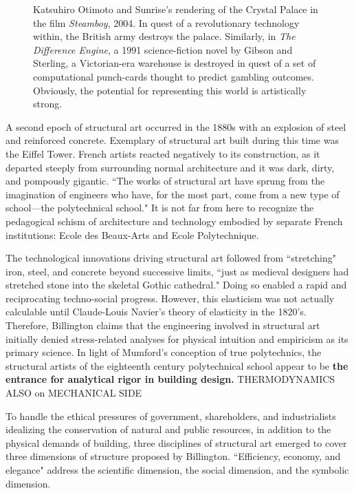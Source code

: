 \begin{figure}[h!]
  \centering
  \caption{Katsuhiro Otimoto and Sunrise's rendering of the Crystal Palace in the film \textit{Steamboy}, 2004. In quest of a revolutionary technology within, the British army destroys the palace. Similarly, in \textit{The Difference Engine}, a 1991 science-fiction novel by Gibson and Sterling, a Victorian-era warehouse is destroyed in quest of a set of computational punch-cards thought to predict gambling outcomes. Obviously, the potential for representing this world is artistically strong.}
\end{figure}

A second epoch of structural art occurred in the 1880s with an explosion of steel and reinforced concrete. Exemplary of structural art built during this time was the Eiffel Tower. French artists reacted negatively to its construction, as it departed steeply from surrounding normal architecture and it was dark, dirty, and pompously gigantic. \cite{EIFFELTOWER} ``The works of structural art have sprung from the imagination of engineers who have, for the most part, come from a new type of school---the polytechnical school." \cite[p14]{TOWERANDBRIDGE} It is not far from here to recognize the pedagogical schism of architecture and technology embodied by separate French institutions: Ecole des Beaux-Arts and Ecole Polytechnique. \cite{SPACETIMEARCHITECTURE}

The technological innovations driving structural art followed from ``stretching" iron, steel, and concrete beyond successive limits, ``just as medieval designers had stretched stone into the skeletal Gothic cathedral." \cite[p5]{TOWERANDBRIDGE} Doing so enabled a rapid and reciprocating techno-social progress. However, this elasticism was not actually calculable until Claude-Louis Navier's theory of elasticity in the 1820's. \cite[p73]{RETROFITTINGMASONRY} Therefore, Billington claims that the engineering involved in structural art initially denied stress-related analyses for physical intuition and empiricism as its primary science. \cite[p43]{TOWERANDBRIDGE} In light of Mumford's conception of true polytechnics, the structural artists of the eighteenth century polytechnical school appear to be \textbf{the entrance for analytical rigor in building design.} THERMODYNAMICS ALSO on MECHANICAL SIDE


To handle the ethical pressures of government, shareholders, and industrialists idealizing the conservation of natural and public resources, in addition to the physical demands of building, three disciplines of structural art emerged to cover three dimensions of structure proposed by Billington. ``Efficiency, economy, and elegance" address the scientific dimension, the social dimension, and the symbolic dimension. \cite[p5,16,17]{TOWERANDBRIDGE}

